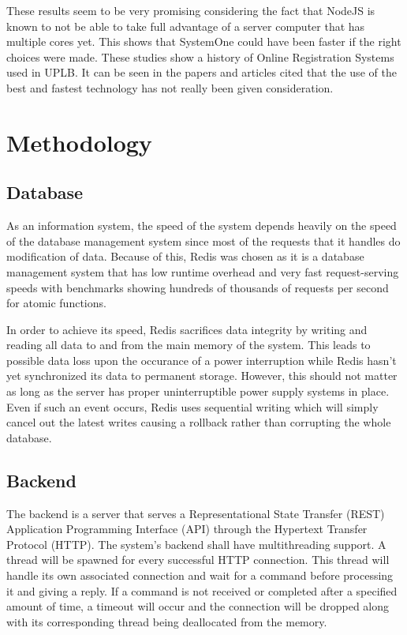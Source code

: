 \documentclass[draft]{sigchi}
\begin{document}
These results seem to be very promising considering the fact that NodeJS is known to not be
able to take full advantage of a server computer that has multiple cores yet. This shows that
SystemOne could have been faster if the right choices were made.
These studies show a history of Online Registration Systems used in UPLB. It can be seen in
the papers and articles cited that the use of the best and fastest technology has not really been
given consideration.

\section{Methodology}

\subsection{Database}

As an information system, the speed of the system depends heavily on the speed
of the database management system since most of the requests that it handles
do modification of data. Because of this, Redis was chosen as it is a database
management system that has low runtime overhead and very fast request-serving
speeds with benchmarks showing hundreds of thousands of requests per second for
atomic functions.

In order to achieve its speed, Redis sacrifices data integrity by writing
and reading all data to and from the main memory of the system. This leads to possible
data loss upon the occurance of a power interruption while Redis hasn't yet synchronized
its data to permanent storage. However, this should not matter as long as the server
has proper uninterruptible power supply systems in place. Even if such an event occurs,
Redis uses sequential writing which will simply cancel out the latest writes causing a
rollback rather than corrupting the whole database.

\subsection{Backend}

The backend is a server that serves a Representational State Transfer (REST)
Application Programming Interface (API) through the Hypertext Transfer Protocol
(HTTP). The system's backend shall have multithreading support. A thread will be 
spawned for every successful HTTP connection. This thread will handle its own
associated connection and wait for a command before processing it and giving a 
reply. If a command is not received or completed after a specified amount of
time, a timeout will occur and the connection will be dropped along with its
corresponding thread being deallocated from the memory. 
\end{document}

